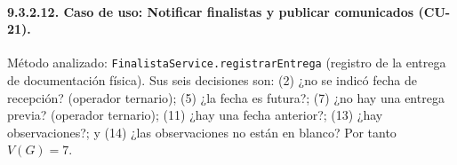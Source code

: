 \paragraph{9.3.2.12. Caso de uso: Notificar finalistas y publicar comunicados (CU-21).}

Método analizado: \texttt{FinalistaService.registrarEntrega} (registro de la entrega de documentación física). Sus seis decisiones son: (2) ¿no se indicó fecha de recepción? (operador ternario); (5) ¿la fecha es futura?; (7) ¿no hay una entrega previa? (operador ternario); (11) ¿hay una fecha anterior?; (13) ¿hay observaciones?; y (14) ¿las observaciones no están en blanco? Por tanto $V(G)=7$.

